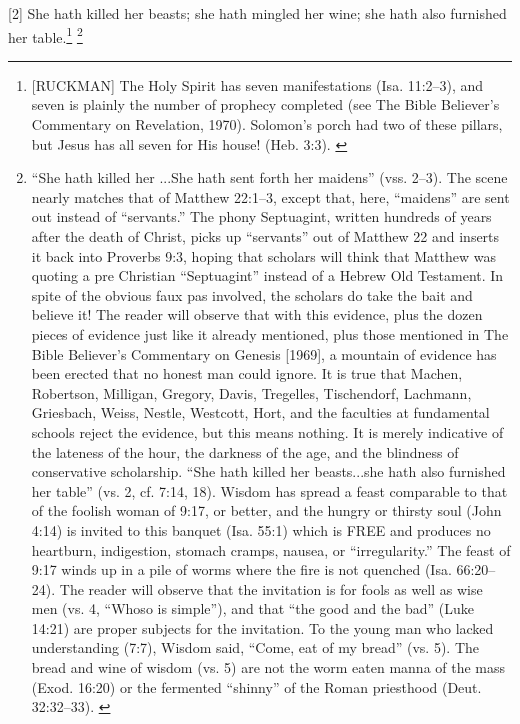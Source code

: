 [2] \textcolor[rgb]{0.00,0.00,1.00}{She hath killed her beasts; she hath mingled her wine; she hath also furnished her table.}\footnote{[RUCKMAN] The Holy Spirit has seven manifestations  (Isa. 11:2–3), and seven is plainly the number of prophecy completed (see The Bible Believer’s Commentary on Revelation, 1970). Solomon’s porch had two of these pillars, but Jesus has all seven for His house! (Heb. 3:3). \cite{Ruckman1972Proverbs}} \footnote{“She hath killed her ...She hath sent forth her maidens” (vss. 2--3). The scene nearly matches that of Matthew 22:1--3, except that, here, “maidens” are sent out instead of “servants.” The phony Septuagint, written hundreds of years after the death of Christ, picks up “servants” out of Matthew 22 and inserts it back into Proverbs 9:3, hoping that scholars will think that Matthew was quoting a pre Christian “Septuagint” instead of a Hebrew Old Testament. In spite of the obvious faux pas involved, the scholars do take the bait and believe it! The reader will observe that with this evidence, plus the dozen pieces of evidence just like it already mentioned, plus those mentioned in The Bible Believer’s Commentary on Genesis [1969], a mountain of evidence has been erected that no honest man could ignore. It is true that Machen, Robertson, Milligan, Gregory, Davis, Tregelles, Tischendorf, Lachmann, Griesbach, Weiss, Nestle, Westcott, Hort, and the faculties at fundamental schools reject the evidence, but this means nothing. It is merely indicative of the lateness of the hour, the darkness of the age, and the blindness of conservative scholarship. “She hath killed her beasts...she hath also furnished her table” (vs. 2, cf. 7:14, 18). Wisdom has spread a feast comparable to that of the foolish woman of 9:17, or better, and the hungry or thirsty soul (John 4:14) is invited to this banquet (Isa. 55:1) which is FREE and produces no heartburn, indigestion, stomach cramps, nausea, or “irregularity.” The feast of 9:17 winds up in a pile of worms where the fire is not quenched (Isa. 66:20–24). The reader will observe that the invitation is for fools as well as wise men (vs. 4, “Whoso is simple”), and that “the good and the bad” (Luke 14:21) are proper subjects for the invitation. To the young man who lacked understanding (7:7), Wisdom said, “Come, eat of my bread” (vs. 5). The bread and wine of wisdom (vs. 5) are not the worm eaten manna of the mass (Exod. 16:20) or the fermented “shinny” of the Roman priesthood (Deut. 32:32–33). \cite{Ruckman1972Proverbs}}
